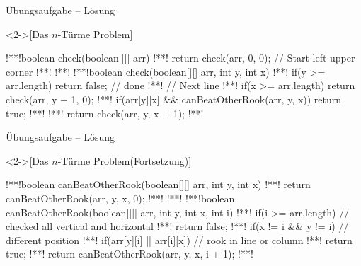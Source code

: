\begin{frame}[fragile,c]{Übungsaufgabe -- Lösung}
    \begin{solve}<2->[Das \(n\)-Türme Problem]
\begin{plainjava}
!**!boolean check(boolean[][] arr) {
!**!    return check(arr, 0, 0); // Start left upper corner
!**!}
!**!
!**!boolean check(boolean[][] arr, int y, int x) {
!**!    if(y >= arr.length) return false; // done
!**!    // Next line
!**!    if(x >= arr.length) return check(arr, y + 1, 0);
!**!    if(arr[y][x] && canBeatOtherRook(arr, y, x)) return true;
!**!
!**!    return check(arr, y, x + 1);
!**!}
\end{plainjava}
    \end{solve}
\end{frame}

\begin{frame}[fragile,c]{Übungsaufgabe -- Lösung}
    \addtocounter{solve}{-1}%
    \begin{solve}<2->[Das \(n\)-Türme Problem\hfill(Fortsetzung)]
\begin{plainjava}
!**!boolean canBeatOtherRook(boolean[][] arr, int y, int x) {
!**!    return canBeatOtherRook(arr, y, x, 0);
!**!}
!**!
!**!boolean canBeatOtherRook(boolean[][] arr, int y, int x, int i) {
!**!    if(i >= arr.length) // checked all vertical and horizontal
!**!        return false;
!**!    if(x != i && y != i) // different position
!**!        if(arr[y][i] || arr[i][x]) // rook in line or column
!**!            return true;
!**!    return canBeatOtherRook(arr, y, x, i + 1);
!**!}
\end{plainjava}
    \end{solve}
\end{frame}
\fi